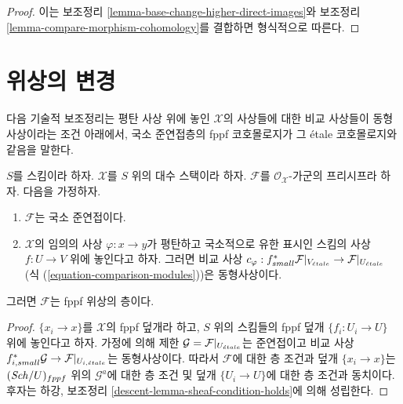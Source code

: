 \begin{proof}
이는 보조정리 \ref{lemma-base-change-higher-direct-images}와
보조정리 \ref{lemma-compare-morphism-cohomology}를 결합하면 형식적으로
따른다.
\end{proof}











\section{위상의 변경}
\label{section-change-topology}

\noindent
다음 기술적 보조정리는 평탄 사상 위에 놓인
$\mathcal{X}$의 사상들에 대한 비교 사상들이 동형사상이라는
조건 아래에서, 국소 준연접층의 fppf 코호몰로지가
그 \'etale 코호몰로지와 같음을 말한다.

\begin{lemma}
\label{lemma-lqc-flat-base-change-fppf-sheaf}
$S$를 스킴이라 하자. $\mathcal{X}$를 $S$ 위의 대수 스택이라 하자.
$\mathcal{F}$를 $\mathcal{O}_\mathcal{X}$-가군의 프리시프라 하자.
다음을 가정하자.
\begin{enumerate}
\item[(a)] $\mathcal{F}$는 국소 준연접이다.
\item[(b)] $\mathcal{X}$의 임의의 사상 $\varphi : x \to y$가
평탄하고 국소적으로 유한 표시인 스킴의 사상 $f : U \to V$ 위에
놓인다고 하자. 그러면 비교 사상
$c_\varphi : f_{small}^*\mathcal{F}|_{V_{\acute{e}tale}} \to
\mathcal{F}|_{U_{\acute{e}tale}}$ (식
(\ref{equation-comparison-modules}))은 동형사상이다.
\end{enumerate}
그러면 $\mathcal{F}$는 fppf 위상의 층이다.
\end{lemma}

\begin{proof}
$\{x_i \to x\}$를 $\mathcal{X}$의 fppf 덮개라 하고,
$S$ 위의 스킴들의 fppf 덮개 $\{f_i : U_i \to U\}$ 위에 놓인다고 하자.
가정에 의해 제한 $\mathcal{G} = \mathcal{F}|_{U_{\acute{e}tale}}$는 준연접이고
비교 사상
$f_{i, small}^*\mathcal{G} \to \mathcal{F}|_{U_{i, {\acute{e}tale}}}$는
동형사상이다. 따라서 $\mathcal{F}$에 대한 층 조건과
덮개 $\{x_i \to x\}$는 $(\mathit{Sch}/U)_{fppf}$ 위의
$\mathcal{G}^a$에 대한 층 조건 및 덮개 $\{U_i \to U\}$에 대한
층 조건과 동치이다. 후자는 하강, 보조정리
\ref{descent-lemma-sheaf-condition-holds}에 의해 성립한다.
\end{proof}

